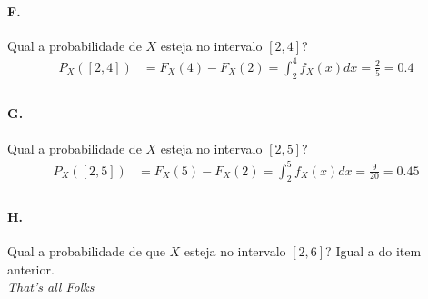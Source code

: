 \documentclass{article}
\begin{document}
\paragraph*{F.} Qual a probabilidade de $X$ esteja no intervalo $[2,4]$?
\begin{align*}
    P_X([2,4]) &= F_X(4) - F_X(2) = \int_2^4 f_X(x)dx = \frac{2}{5} = 0.4 \\
\end{align*}

\paragraph*{G.} Qual a probabilidade de $X$ esteja no intervalo $[2,5]$?
\begin{align*}
    P_X([2,5]) &= F_X(5) - F_X(2) = \int_2^5 f_X(x)dx = \frac{9}{20} = 0.45 \\
\end{align*}

\paragraph*{H.} Qual a probabilidade de que $X$ esteja no intervalo $[2,6]$?
Igual a do item anterior.
\\
\textit{That's all Folks}
\end{document}
